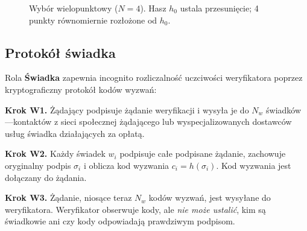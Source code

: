 \documentclass[11pt,a4paper,twocolumn]{article}
\begin{document}
\begin{figure}[ht]
\centering
{}
\caption{Wybór wielopunktowy ($N{=}4$). Hasz $h_0$ ustala przesunięcie; 4 punkty równomiernie rozłożone od $h_0$.}
\label{fig:multipoint}
\end{figure}

\subsection{Protokół świadka}

Rola \textbf{Świadka} zapewnia incognito rozliczalność uczciwości weryfikatora poprzez kryptograficzny protokół kodów wyzwań:

\textbf{Krok W1.} Żądający podpisuje żądanie weryfikacji i wysyła je do $N_w$ świadków---kontaktów z sieci społecznej żądającego lub wyspecjalizowanych dostawców usług świadka działających za opłatą.

\textbf{Krok W2.} Każdy świadek $w_i$ podpisuje całe podpisane żądanie, zachowuje oryginalny podpis $\sigma_i$ i oblicza kod wyzwania $c_i = h(\sigma_i)$. Kod wyzwania jest dołączany do żądania.

\textbf{Krok W3.} Żądanie, niosące teraz $N_w$ kodów wyzwań, jest wysyłane do weryfikatora. Weryfikator obserwuje kody, ale \emph{nie może ustalić}, kim są świadkowie ani czy kody odpowiadają prawdziwym podpisom.
\end{document}

